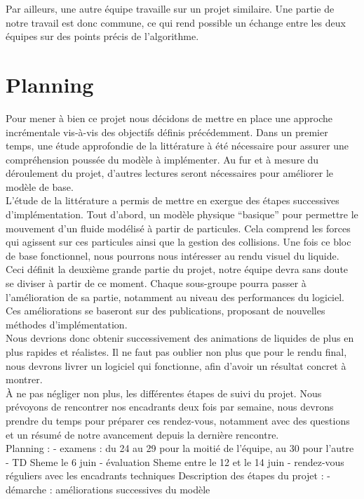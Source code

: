 \documentclass[12pt]{article}
\begin{document}
Par ailleurs, une autre équipe travaille sur un projet similaire. Une partie de notre travail est donc commune, ce qui rend possible un échange entre les deux équipes sur des points précis de l'algorithme.

\section{Planning}

Pour mener à bien ce projet nous décidons de mettre en place une approche incrémentale vis-à-vis des objectifs définis précédemment. Dans un premier temps, une étude approfondie de la littérature à été nécessaire pour assurer une compréhension poussée du modèle à implémenter. Au fur et à mesure du déroulement du projet, d'autres lectures seront nécessaires pour améliorer le modèle de base.\\

L'étude de la littérature a permis de mettre en exergue des étapes successives d'implémentation. Tout d'abord, un modèle physique ``basique'' pour permettre le mouvement d'un fluide modélisé à partir de particules. Cela comprend les forces qui agissent sur ces particules ainsi que la gestion des collisions. Une fois ce bloc de base fonctionnel, nous pourrons nous intéresser au rendu visuel du liquide. Ceci définit la deuxième grande partie du projet, notre équipe devra sans doute se diviser à partir de ce moment. Chaque sous-groupe pourra passer à l'amélioration de sa partie, notamment au niveau des performances du logiciel. Ces améliorations se baseront sur des publications, proposant de nouvelles méthodes d'implémentation.\\

Nous devrions donc obtenir successivement des animations de liquides de plus en plus rapides et réalistes. Il ne faut pas oublier non plus que pour le rendu final, nous devrons livrer un logiciel qui fonctionne, afin d'avoir un résultat concret à montrer.\\

À ne pas négliger non plus, les différentes étapes de suivi du projet. Nous prévoyons de rencontrer nos encadrants deux fois par semaine, nous devrons prendre du temps pour préparer ces rendez-vous, notamment avec des questions et un résumé de notre avancement depuis la dernière rencontre. \\

Planning :
- examens : du 24 au 29 pour la moitié de l'équipe, au 30 pour l'autre
- TD Sheme le 6 juin
- évaluation Sheme entre le 12 et le 14 juin
- rendez-vous réguliers avec les encadrants techniques
Description des étapes du projet :
- démarche : améliorations successives du modèle
\end{document}
